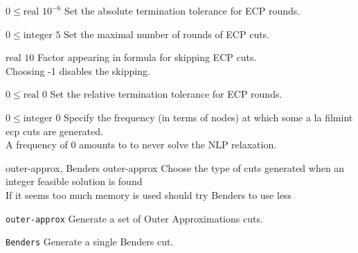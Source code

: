 %
{$0\leq\textrm{real}$}%
{$10^{- 6}$}%
{Set the absolute termination tolerance for ECP rounds.}%
{}

%
{$0\leq\textrm{integer}$}%
{$5$}%
{Set the maximal number of rounds of ECP cuts.}%
{}

%
{$\textrm{real}$}%
{$10$}%
{Factor appearing in formula for skipping ECP cuts.\\
Choosing -1 disables the skipping.}%
{}

%
{$0\leq\textrm{real}$}%
{$0$}%
{Set the relative termination tolerance for ECP rounds.}%
{}

%
{$0\leq\textrm{integer}$}%
{$0$}%
{Specify the frequency (in terms of nodes) at which some a la filmint ecp cuts are generated.\\
A frequency of 0 amounts to to never solve the NLP relaxation.}%
{}

%
{\ttfamily outer-approx, Benders}%
{outer-approx}%
{Choose the type of cuts generated when an integer feasible solution is found\\
If it seems too much memory is used should try Benders to use less}%
{\begin{list}{}{
\setlength{\parsep}{0em}
\setlength{\leftmargin}{5ex}
\setlength{\labelwidth}{2ex}
\setlength{\itemindent}{0ex}
\setlength{\topsep}{0pt}}
\item[\texttt{outer-approx}] Generate a set of Outer Approximations cuts.
\item[\texttt{Benders}] Generate a single Benders cut.
\end{list}
}

